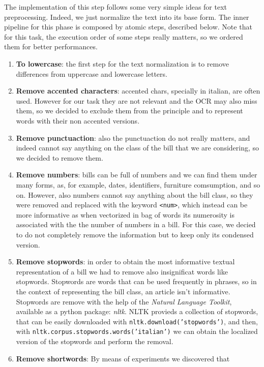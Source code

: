\documentclass[10pt,twocolumn,letterpaper]{article}
\newcommand\codeinline[1]{\texttt{#1}}  %
\begin{document}
The implementation of this step follows some very simple ideas for
text preprocessing. Indeed, we just normalize the text into its base
form. The inner pipeline for this phase is composed by atomic steps,
described below. Note that for this task, the execution order of some
steps really matters, so we ordered them for better performances.

\begin{enumerate}
  \item \textbf{To lowercase}: the first step for the text normalization is to
    remove differences from uppercase and lowercase letters.
  \item \textbf{Remove accented characters}: accented chars, specially in
    italian, are often used. However for our task they are not relevant
    and the OCR may also miss them, so we decided to exclude them from
    the principle and to represent words with their non accented
    versions.
  \item \textbf{Remove punctuaction}: also the punctuaction do not really
    matters, and indeed cannot say anything on the class of the bill
    that we are considering, so we decided to remove them.
  \item \textbf{Remove numbers}: bills can be full of numbers and we
    can find them under many forms, as, for example, dates,
    identifiers, furniture comsumption, and so on. However, also
    numbers cannot say anything about the bill class, so they were
    removed and replaced with the keyword \codeinline{<num>}, which
    instead can be more informative as when vectorized in bag of words
    its numerosity is associated with the the number of numbers in a
    bill. For this case, we decied to do not completely remove the
    information but to keep only its condensed version.
  \item \textbf{Remove stopwords}: in order to obtain the most informative
    textual representation of a bill we had to remove also
    insignificat words like stopwords. Stopwords are words that can be
    used frequently in phrases, so in the context of representing the
    bill class, an article isn't informative. Stopwords are remove
    with the help of the \emph{Natural Language Toolkit}, available as
    a python package: \emph{nltk}. NLTK provieds a collection of
    stopwords, that can be easily downloaded with
    \codeinline{nltk.download('stopwords')}, and then, with
    \codeinline{nltk.corpus.stopwords.words('italian')} we can obtain the
    localized version of the stopwords and perform the removal.
  \item \textbf{Remove shortwords}: By means of experiments we discovered that

\end{enumerate}
\end{document}

